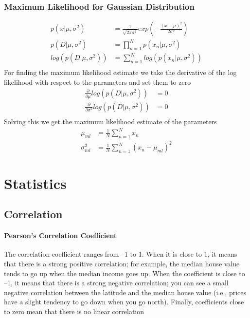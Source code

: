 \documentclass{article}
\begin{document}
\subsubsection{Maximum Likelihood for Gaussian Distribution}
\begin{align*}
    p(x|\mu,\sigma^2)      & = \frac{1}{\sqrt{2\pi\sigma^2}}exp(-\frac{(x-\mu)^2}{2\sigma^2}) \\
    p(D|\mu,\sigma^2)      & = \prod_{n=1}^{N}p(x_n|\mu,\sigma^2)                             \\
    log(p(D|\mu,\sigma^2)) & = \sum_{n=1}^{N}log(p(x_n|\mu,\sigma^2))                         \\
\end{align*}
For finding the maximum likelihood estimate we take the derivative of the log likelihood with respect to the parameters and set them to zero
\begin{align*}
    \frac{\partial}{\partial \mu}log(p(D|\mu,\sigma^2))      & = 0 \\
    \frac{\partial}{\partial \sigma^2}log(p(D|\mu,\sigma^2)) & = 0 \\
\end{align*}
Solving this we get the maximum likelihood estimate of the parameters
\begin{align*}
    \mu_{ml}      & = \frac{1}{N}\sum_{n=1}^{N}x_n              \\
    \sigma^2_{ml} & = \frac{1}{N}\sum_{n=1}^{N}(x_n-\mu_{ml})^2
\end{align*}

\newpage
\section{Statistics}
\subsection{Correlation}
\paragraph{Pearson's Correlation Coefficient} The correlation coefficient ranges from –1 to 1. When it is close to 1, it means that
there is a strong positive correlation; for example, the median house value tends to go
up when the median income goes up. When the coefficient is close to –1, it means
that there is a strong negative correlation; you can see a small negative correlation
between the latitude and the median house value (i.e., prices have a slight tendency to
go down when you go north). Finally, coefficients close to zero mean that there is no
linear correlation
\end{document}
